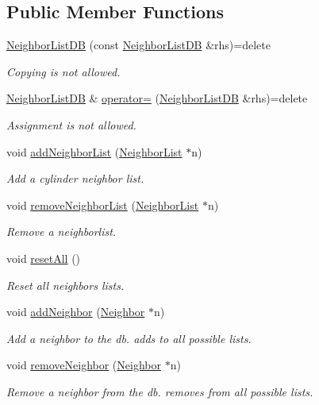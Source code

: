 \subsection*{Public Member Functions}
\begin{DoxyCompactItemize}
\item 
\hyperlink{classNeighborListDB_a66e17ea4c1ed6843a9cbf341d81dd319}{Neighbor\+List\+D\+B} (const \hyperlink{classNeighborListDB}{Neighbor\+List\+D\+B} \&rhs)=delete
\begin{DoxyCompactList}\small\item\em Copying is not allowed. \end{DoxyCompactList}\item 
\hyperlink{classNeighborListDB}{Neighbor\+List\+D\+B} \& \hyperlink{classNeighborListDB_a0dc149500a566f2f28f89955b3290431}{operator=} (\hyperlink{classNeighborListDB}{Neighbor\+List\+D\+B} \&rhs)=delete
\begin{DoxyCompactList}\small\item\em Assignment is not allowed. \end{DoxyCompactList}\item 
void \hyperlink{classNeighborListDB_a26b04783c598f4cb5423a4bcce8554ce}{add\+Neighbor\+List} (\hyperlink{classNeighborList}{Neighbor\+List} $\ast$n)
\begin{DoxyCompactList}\small\item\em Add a cylinder neighbor list. \end{DoxyCompactList}\item 
void \hyperlink{classNeighborListDB_a01c426f9c5a014a529958d66129f772f}{remove\+Neighbor\+List} (\hyperlink{classNeighborList}{Neighbor\+List} $\ast$n)
\begin{DoxyCompactList}\small\item\em Remove a neighborlist. \end{DoxyCompactList}\item 
void \hyperlink{classNeighborListDB_a0c4edc8d767cab8ce1e59dd148615ff8}{reset\+All} ()
\begin{DoxyCompactList}\small\item\em Reset all neighbors lists. \end{DoxyCompactList}\item 
void \hyperlink{classNeighborListDB_acef95255a2c5080ee9d51227e176bcd8}{add\+Neighbor} (\hyperlink{classNeighbor}{Neighbor} $\ast$n)
\begin{DoxyCompactList}\small\item\em Add a neighbor to the db. adds to all possible lists. \end{DoxyCompactList}\item 
void \hyperlink{classNeighborListDB_a061560a7c9cdcc50c9a5b1d66e2e1b7f}{remove\+Neighbor} (\hyperlink{classNeighbor}{Neighbor} $\ast$n)
\begin{DoxyCompactList}\small\item\em Remove a neighbor from the db. removes from all possible lists. \end{DoxyCompactList}\end{DoxyCompactItemize}
